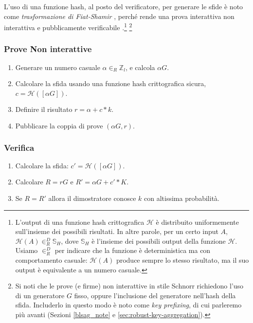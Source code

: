 L’uso di una funzione hash, al posto del verificatore, per generare le sfide è noto come {\em trasformazione di Fiat-Shamir} \cite{fiat-shamir-transform}, perché rende una prova interattiva non interattiva e pubblicamente verificabile \cite{Signatures2015BorromeanRS}.\footnote{L’output di una funzione hash crittografica $\mathcal{H}$ è distribuito uniformemente sull’insieme dei possibili risultati. In altre parole, per un certo input $A$, $\mathcal{H}(A) \in^D_R \mathbb{S}_H$, dove $\mathbb{S}_H$ è l’insieme dei possibili output della funzione $\mathcal{H}$. Usiamo $\in^D_R$ per indicare che la funzione è deterministica ma con comportamento casuale: $\mathcal{H}(A)$ produce sempre lo stesso risultato, ma il suo output è equivalente a un numero casuale.}
\footnote{Si noti che le prove (e firme) non interattive in stile Schnorr richiedono l’uso di un generatore $G$ fisso, oppure l’inclusione del generatore nell’hash della sfida. Includerlo in questo modo è noto come \textit{key prefixing}, di cui parleremo più avanti (Sezioni \ref{blsag_note} e \ref{sec:robust-key-aggregation}).}

\subsubsection*{Prove Non interattive}

\begin{enumerate}
	\item Generare un numero casuale $\alpha \in_R \mathbb{Z}_l$, e calcola $\alpha G$.
	\item Calcolare la sfida usando una funzione hash crittografica sicura, \(c = \mathcal{H}([\alpha G])\).
	\item Definire il risultato $r = \alpha + c*k$.
	\item Pubblicare la coppia di prove $(\alpha G, r)$.
\end{enumerate}

\subsubsection*{Verifica}

\begin{enumerate}
	\item Calcolare la sfida: \(c' = \mathcal{H}([\alpha G])\).
	\item Calcolare $R = r G$ e $R' = \alpha G + c'*K$.
	\item Se $R = R'$ allora il dimostratore conosce $k$ con altissima probabilità.
\end{enumerate}

